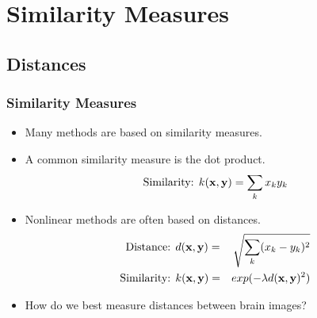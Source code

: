 \documentclass{beamer}
\begin{document}
\section{Similarity Measures}
\subsection{Distances}
\begin{frame}
\frametitle{Similarity Measures}
\begin{itemize}
\item Many methods are based on similarity measures.
\item A common similarity measure is the dot product.
\begin{eqnarray*}
\text{Similarity: } k({\bf x},{\bf y}) = \sum_k x_k y_k
\end{eqnarray*}
\item Nonlinear methods are often based on distances.
\begin{eqnarray*}
\text{Distance: } & d({\bf x},{\bf y}) = & \sqrt{\sum_k (x_k-y_k)^2}\cr
\text{Similarity: } & k({\bf x},{\bf y}) = & exp(-\lambda d({\bf x},{\bf y})^2)
\end{eqnarray*}
\item How do we best measure distances between brain images?
\end{itemize}
\end{frame}




\end{document}
